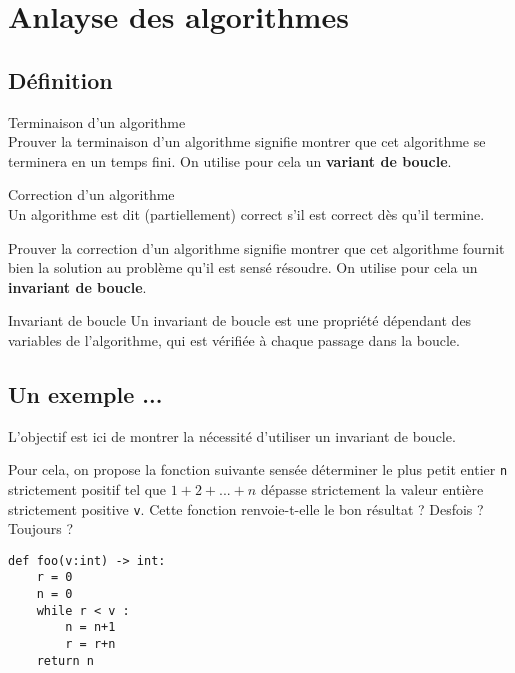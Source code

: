 
\section{Anlayse des algorithmes}

\subsection{Définition}

\begin{defi}{Terminaison d'un algorithme} \\
Prouver la terminaison d'un algorithme signifie montrer que cet algorithme se terminera en un temps fini. On utilise pour cela un \textbf{variant de boucle}.
\end{defi}

\begin{defi}{Correction d'un algorithme} \\
Un algorithme est dit (partiellement) correct s'il est correct dès qu'il termine. 

\end{defi}
Prouver la correction d'un algorithme signifie montrer que cet algorithme fournit bien la solution au problème qu'il est sensé résoudre. On utilise pour cela un \textbf{invariant de boucle}.

\begin{defi}{Invariant de boucle}
Un invariant de boucle est une propriété dépendant des variables de l’algorithme, qui est vérifiée à
chaque passage dans la boucle.
\end{defi}


\subsection{Un exemple ...}
\begin{obj}

L'objectif est ici de montrer la nécessité d'utiliser un invariant de boucle.

Pour cela, on propose la fonction suivante sensée déterminer le plus petit entier \texttt{n} strictement positif tel que $1 + 2 + . . . + n$ dépasse strictement la valeur entière strictement positive \texttt{v}. Cette fonction renvoie-t-elle le bon résultat ? Desfois ? Toujours ?
\end{obj}
\begin{lstlisting}
def foo(v:int) -> int:
    r = 0
    n = 0
    while r < v : 
        n = n+1
        r = r+n
    return n
\end{lstlisting}

